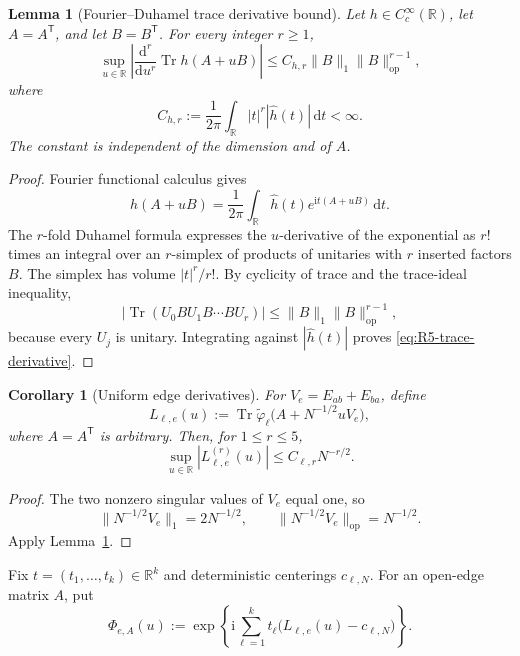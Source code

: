 \documentclass[10pt,a4paper]{amsart}
\newtheorem{lemma}[theorem]{Lemma}
\newtheorem{corollary}[theorem]{Corollary}
\newcommand{\Tr}{\operatorname{Tr}}
\newcommand{\ii}{\mathrm i}
\newcommand{\dd}{\mathrm d}
\newcommand{\op}{\mathrm{op}}
\newcommand{\norm}[1]{\lVert #1\rVert}
\begin{document}
\begin{lemma}[Fourier--Duhamel trace derivative bound]
\label{lem:R5-Fourier-Duhamel}
Let \(h\in C_c^\infty(\mathbb R)\), let \(A=A^{\mathsf T}\), and let
\(B=B^{\mathsf T}\).  For every integer \(r\ge1\),
\begin{equation}\label{eq:R5-trace-derivative}
 \sup_{u\in\mathbb R}
 \left|\frac{\dd^r}{\dd u^r}\Tr h(A+uB)\right|
 \le
 C_{h,r}\norm{B}_1\norm{B}_{\op}^{r-1},
\end{equation}
where
\begin{equation}\label{eq:R5-Fourier-constant}
 C_{h,r}:=\frac1{2\pi}\int_{\mathbb R}
 |t|^r|\widehat h(t)|\,\dd t<\infty.
\end{equation}
The constant is independent of the dimension and of \(A\).
\end{lemma}

\begin{proof}
Fourier functional calculus gives
\[
 h(A+uB)=\frac1{2\pi}\int_{\mathbb R}
 \widehat h(t)e^{\ii t(A+uB)}\,\dd t.
\]
The \(r\)-fold Duhamel formula expresses the \(u\)-derivative of the
exponential as \(r!\) times an integral over an \(r\)-simplex of products of
unitaries with \(r\) inserted factors \(B\).  The simplex has volume
\(|t|^r/r!\).  By cyclicity of trace and the trace-ideal inequality,
\[
 |\Tr(U_0BU_1B\cdots BU_r)|
 \le\norm{B}_1\norm{B}_{\op}^{r-1},
\]
because every \(U_j\) is unitary.  Integrating against
\(|\widehat h(t)|\) proves \eqref{eq:R5-trace-derivative}.
\end{proof}

\begin{corollary}[Uniform edge derivatives]
\label{cor:R5-edge-derivatives}
For \(V_e=E_{ab}+E_{ba}\), define
\[
 L_{\ell,e}(u)
 :=\Tr\widetilde\varphi_\ell
 \bigl(A+N^{-1/2}uV_e\bigr),
\]
where \(A=A^{\mathsf T}\) is arbitrary.  Then, for \(1\le r\le5\),
\begin{equation}\label{eq:R5-L-derivatives}
 \sup_{u\in\mathbb R}|L_{\ell,e}^{(r)}(u)|
 \le C_{\ell,r}N^{-r/2}.
\end{equation}
\end{corollary}

\begin{proof}
The two nonzero singular values of \(V_e\) equal one, so
\[
 \norm{N^{-1/2}V_e}_1=2N^{-1/2},
 \qquad
 \norm{N^{-1/2}V_e}_{\op}=N^{-1/2}.
\]
Apply Lemma~\ref{lem:R5-Fourier-Duhamel}.
\end{proof}

Fix \(t=(t_1,\ldots,t_k)\in\mathbb R^k\) and deterministic centerings
\(c_{\ell,N}\).  For an open-edge matrix \(A\), put
\begin{equation}\label{eq:R5-Phi}
 \Phi_{e,A}(u)
 :=
 \exp\left\{
 \ii\sum_{\ell=1}^kt_\ell
 \bigl(L_{\ell,e}(u)-c_{\ell,N}\bigr)
 \right\}.
\end{equation}
\end{document}
